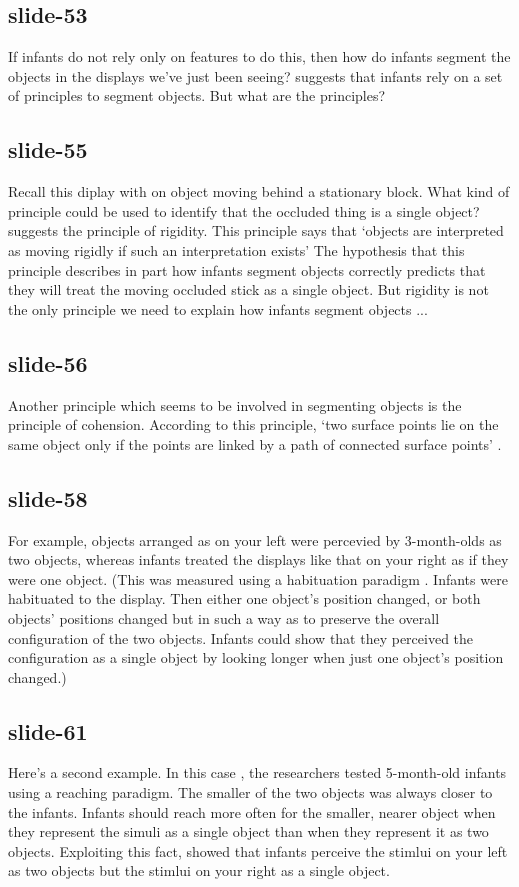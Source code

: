 \documentclass[12pt,\papersize]{extarticle}
\begin{document}
 
\subsection{slide-53}
If infants do not rely only on features to do this, then how do infants segment the objects in the displays we've just been seeing?
\citet{Spelke:1990jn} suggests that infants rely on a set of principles to segment objects. But what are the principles?
 
 
\subsection{slide-55}
Recall this diplay with on object moving behind a stationary block.
What kind of principle could be used to identify that the occluded thing is a single object?
\citet{Spelke:1990jn} suggests the principle of rigidity. This principle says that ‘objects are interpreted as moving rigidly if such an interpretation exists’ The hypothesis that this principle describes in part how infants segment objects correctly predicts that they will treat the moving occluded stick as a single object.
But rigidity is not the only principle we need to explain how infants segment objects ...
 
 
\subsection{slide-56}
Another principle which seems to be involved in segmenting objects is the principle of cohension. According to this principle, ‘two surface points lie on the same object only if the points are linked by a path of connected surface points’ \citep{Spelke:1990jn}.
 
 
\subsection{slide-58}
For example, objects arranged as on your left were percevied by 3-month-olds as two objects, whereas infants treated the displays like that on your right as if they were one object.
(This was measured using a habituation paradigm \citep{kestenbaum:1987_perception}. Infants were habituated to the display. Then either one object's position changed, or both objects' positions changed but in such a way as to preserve the overall configuration of the two objects. Infants could show that they perceived the configuration as a single object by looking longer when just one object's position changed.)
 
 
\subsection{slide-61}
Here's a second example.
In this case \citep[Experiment 2]{spelke:1989_reaching}, the researchers tested 5-month-old infants using a reaching paradigm.
The smaller of the two objects was always closer to the infants. Infants should reach more often for the smaller, nearer object when they represent the simuli as a single object than when they represent it as two objects.
Exploiting this fact, \citet[Experiment 2]{spelke:1989_reaching} showed that infants perceive the stimlui on your left as two objects but the stimlui on your right as a single object.
 
\end{document}
